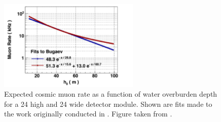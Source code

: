 \begin{figure} %
    \includegraphics[width=0.6\textwidth]{diagrams/4-chips/cosmic_rate.pdf}
    \caption[Expected \chipsfive cosmic muon rate as a function of water overburden depth]
    {Expected cosmic muon rate as a function of water overburden depth for a \SI{24}{}
        high and \SI{24}{} wide \chips detector module. Shown are fits made to the work
        originally conducted in . Figure taken from
        .}
    \label{fig:cosmic_rate}
\end{figure}